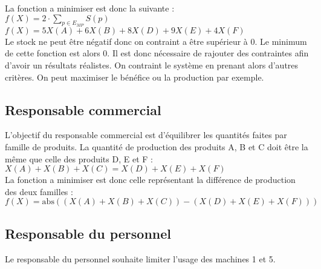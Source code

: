 \documentclass[a4paper, 11pt]{article}
\begin{document}
La fonction a minimiser est donc la suivante : \\
$f(X) = 2\cdot \sum_{p\in E_{MP}} S(p)$ \\
$f(X) = 5 X(A) + 6 X(B) + 8 X(D) + 9 X(E) + 4 X(F)$ \\

Le stock ne peut être négatif donc on contraint a être supérieur à 0.
Le minimum de cette fonction est alors 0. Il est donc nécessaire de rajouter
des contraintes afin d'avoir un résultats réalistes.
On contraint le système en prenant alors d'autres critères.
On peut maximiser le bénéfice ou la production par exemple.

\subsection{Responsable commercial}
L'objectif du responsable commercial est d'équilibrer les quantités faites par famille de produits.
La quantité de production des produits A, B et C doit être la même que celle des produits D, E et F : \\
$X(A) + X(B) + X(C) = X(D) + X(E) + X(F)$ \\

La fonction a minimiser est donc celle représentant la différence de production des deux familles : \\
$f(X) = \mbox{abs}((X(A) + X(B) + X(C)) - (X(D) + X(E) + X(F))) $

\subsection{Responsable du personnel}
Le responsable du personnel souhaite limiter l'usage des machines 1 et 5.
\end{document}
